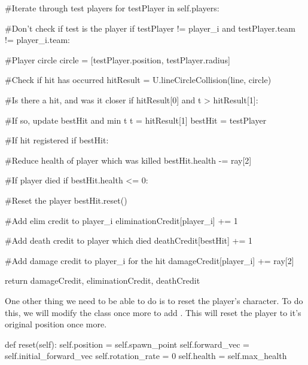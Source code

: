\begin{mpy}
                #Iterate through test players
                for testPlayer in self.players:

                    #Don't check if test is the player
                    if testPlayer != player_i and testPlayer.team != player_i.team:

                        #Player circle
                        circle = [testPlayer.position, testPlayer.radius]

                        #Check if hit has occurred
                        hitResult = U.lineCircleCollision(line, circle)

                        #Is there a hit, and was it closer
                        if hitResult[0] and t > hitResult[1]:

                            #If so, update bestHit and min t
                            t = hitResult[1]
                            bestHit = testPlayer

                        #If hit registered
                        if bestHit:

                            #Reduce health of player which was killed
                            bestHit.health -= ray[2]
                            
                            #If player died
                            if bestHit.health <= 0:

                                #Reset the player
                                bestHit.reset()

                                #Add elim credit to player_i
                                eliminationCredit[player_i] += 1

                                #Add death credit to player which died
                                deathCredit[bestHit] += 1

                            #Add damage credit to player_i for the hit
                            damageCredit[player_i] += ray[2]

        return damageCredit, eliminationCredit, deathCredit
\end{mpy}

One other thing we need to be able to do is to reset the player's character. To do this, we will modify the  class once more to add . This will reset the player to it's original position once more.

\begin{mpy}
    def reset(self):
        self.position = self.spawn_point
        self.forward_vec = self.initial_forward_vec
        self.rotation_rate = 0
        self.health = self.max_health
\end{mpy}

